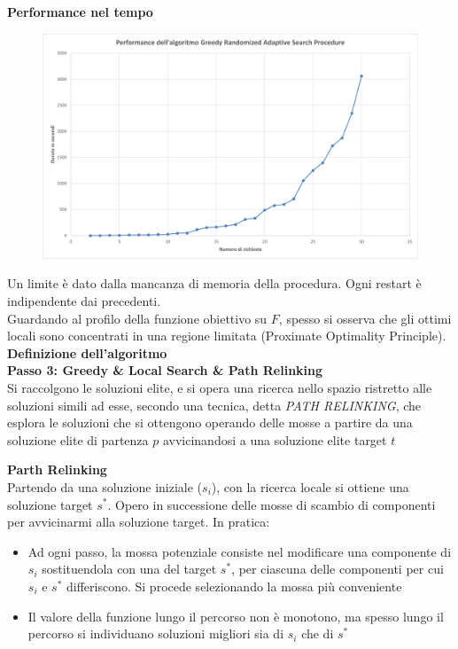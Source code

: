 \documentclass[9pt]{beamer}
\begin{document}
\begin{frame}[allowframebreaks]{\subsecname}
\framebreak

	\textbf{Performance nel tempo}
      	\begin{figure}[h]
	\centering
	\includegraphics[width=\textwidth]
	{../charts/15 Performance dell'algoritmo Greedy Randomized Adaptive Search Procedure}
	\end{figure}

\framebreak

	Un limite è dato dalla mancanza di memoria della procedura. Ogni restart è indipendente dai precedenti. \\
	Guardando al profilo della funzione obiettivo su $F$, spesso si osserva che gli ottimi locali sono concentrati in una regione limitata (Proximate Optimality Principle). \\

	\textbf{Definizione dell'algoritmo} \\
	\textbf{\footnotesize Passo 3: Greedy \& Local Search \& Path Relinking} \\
	Si raccolgono le soluzioni elite, e si opera una ricerca nello spazio ristretto alle soluzioni simili ad esse, secondo una tecnica, detta \emph{PATH RELINKING}, che esplora le soluzioni che si ottengono operando delle mosse a partire da una soluzione elite di partenza $p$ avvicinandosi a una soluzione elite target $t$

	\textbf{Parth Relinking} \\
	Partendo da una soluzione iniziale ($s_i$), con la ricerca locale si ottiene una soluzione target $s^*$. Opero in successione delle mosse di scambio di componenti per avvicinarmi alla soluzione target. In pratica:
	\begin{itemize}
		\item
		Ad ogni passo, la mossa potenziale consiste nel modificare una componente di $s_i$ sostituendola con una del target $s^*$, per ciascuna delle componenti per cui $s_i$ e $s^*$ differiscono. Si procede selezionando la mossa più conveniente
		\item
		Il valore della funzione lungo il percorso non è monotono, ma spesso lungo il percorso si individuano soluzioni migliori sia di $s_i$ che di $s^*$
	\end{itemize}


\end{frame}
\end{document}
